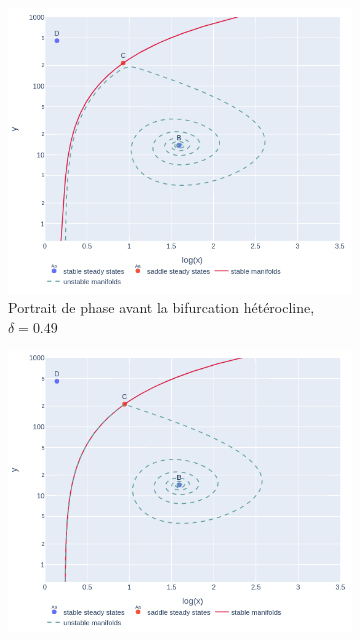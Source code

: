 \documentclass[12pt]{article}
\begin{document}
\begin{figure}[!ht]
    \centering
    \begin{subfigure}[b]{0.4\textwidth}
         \centering
         \includegraphics[width=\textwidth]{../figures/fig_heteroclinic_before.png}
         \caption{Portrait de phase avant la bifurcation hétérocline, $\delta = 0.49$}
         \label{fig::heteroclinic_bifurcation_a}
     \end{subfigure}\hfill
     \begin{subfigure}[b]{0.4\textwidth}
         \centering
         \includegraphics[width=\textwidth]{../figures/fig_heteroclinic.png}

\end{subfigure}
\end{figure}
\end{document}
